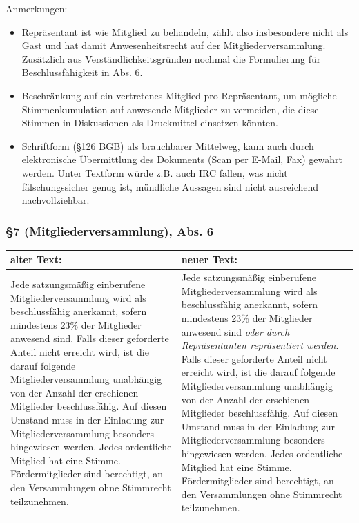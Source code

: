 \documentclass[a4paper,12pt]{scrartcl}
\begin{document}
Anmerkungen:

\begin{itemize}
\item
  Repräsentant ist wie Mitglied zu behandeln, zählt also insbesondere
  nicht als Gast und hat damit Anwesenheitsrecht auf der
  Mitgliederversammlung. Zusätzlich aus Verständlichkeitsgründen nochmal
  die Formulierung für Beschlussfähigkeit in Abs. 6.
\item
  Beschränkung auf ein vertretenes Mitglied pro Repräsentant, um
  mögliche Stimmenkumulation auf anwesende Mitglieder zu vermeiden, die
  diese Stimmen in Diskussionen als Druckmittel einsetzen könnten.
\item
  Schriftform (§126 BGB) als brauchbarer Mittelweg, kann auch durch
  elektronische Übermittlung des Dokuments (Scan per E-Mail, Fax)
  gewahrt werden. Unter Textform würde z.B. auch IRC fallen, was nicht
  fälschungssicher genug ist, mündliche Aussagen sind nicht ausreichend
  nachvollziehbar.
\end{itemize}

\subsubsection*{§7 (Mitgliederversammlung), Abs. 6}
\begin{longtable}[c]{@{}ll@{}}
\toprule
\begin{minipage}[b]{0.47\columnwidth}\raggedright\strut
alter Text:
\strut\end{minipage} &
\begin{minipage}[b]{0.47\columnwidth}\raggedright\strut
neuer Text:
\strut\end{minipage}\tabularnewline
\midrule
\endhead
\begin{minipage}[t]{0.47\columnwidth}\raggedright\strut
Jede satzungsmäßig einberufene Mitgliederversammlung wird als
beschlussfähig anerkannt, sofern mindestens 23\% der Mitglieder anwesend
sind. Falls dieser geforderte Anteil nicht erreicht wird, ist die darauf
folgende Mitgliederversammlung unabhängig von der Anzahl der erschienen
Mitglieder beschlussfähig. Auf diesen Umstand muss in der Einladung zur
Mitgliederversammlung besonders hingewiesen werden. Jedes ordentliche
Mitglied hat eine Stimme. Fördermitglieder sind berechtigt, an den
Versammlungen ohne Stimmrecht teilzunehmen.
\strut\end{minipage} &
\begin{minipage}[t]{0.47\columnwidth}\raggedright\strut
Jede satzungsmäßig einberufene Mitgliederversammlung wird als
beschlussfähig anerkannt, sofern mindestens 23\% der Mitglieder anwesend
sind \emph{oder durch Repräsentanten repräsentiert werden}. Falls dieser
geforderte Anteil nicht erreicht wird, ist die darauf folgende
Mitgliederversammlung unabhängig von der Anzahl der erschienen
Mitglieder beschlussfähig. Auf diesen Umstand muss in der Einladung zur
Mitgliederversammlung besonders hingewiesen werden. Jedes ordentliche
Mitglied hat eine Stimme. Fördermitglieder sind berechtigt, an den
Versammlungen ohne Stimmrecht teilzunehmen.
\strut\end{minipage}\tabularnewline
\bottomrule
\end{longtable}
\end{document}
